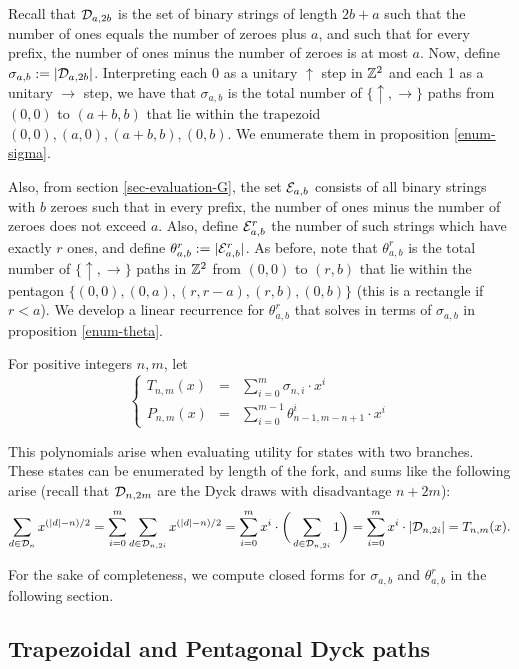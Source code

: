 Recall that $\mathcal{D}_{a,2b}$ is the set of binary strings of length $2b+a$ such that the number of ones equals the number of zeroes plus $a$, and such that for every prefix, the number of ones minus the number of zeroes is at most $a$. Now, define $\sigma_{a,b}:=|\mathcal{D}_{a,2b}|$. Interpreting each 0 as a unitary $\uparrow$ step in $\mathbb{Z}^2$ and each 1 as a unitary $\rightarrow$ step, we have that $\sigma_{a,b}$ is the total number of $\{\uparrow,\rightarrow\}$ paths from $(0,0)$ to $(a+b,b)$ that lie within the trapezoid ${(0,0),(a,0),(a+b,b),(0,b)}$. We enumerate them in proposition \ref{enum-sigma}.

Also, from section \ref{sec-evaluation-G}, the set $\mathcal{E}_{a,b}$ consists of all binary strings with $b$ zeroes such that in every prefix, the number of ones minus the number of zeroes does not exceed $a$. Also, define $\mathcal{E}_{a,b}^r$ the number of such strings which have exactly $r$ ones, and define $\theta_{a,b}^r:= |\mathcal{E}_{a,b}^r|$. As before, note that $\theta_{a,b}^r$ is the total number of $\{\uparrow,\rightarrow\}$ paths in $\mathbb{Z}^2$ from $(0,0)$ to $(r,b)$ that lie within the pentagon $\{(0,0),(0,a),(r,r-a), (r,b), (0,b)\}$ (this is a rectangle if $r<a$). We develop a linear recurrence for $\theta_{a,b}^r$ that solves in terms of $\sigma_{a,b}$ in proposition \ref{enum-theta}. 

\begin{mydef}
For positive integers $n,m$, let
$$
\left\{
\begin{array}{lll}
T_{n,m}(x) &=& \displaystyle \sum_{i = 0}^{m} \sigma_{n,i}\cdot x^i\\
P_{n,m}(x) &=& \displaystyle \sum_{i = 0}^{m-1} \theta_{n-1,m-n+1}^i\cdot x^i
\end{array}
\right.
$$
\end{mydef}

This polynomials arise when evaluating utility for states with two branches. These states can be enumerated by length of the fork, and sums like the following arise (recall that $\mathcal{D}_{n,2m}$ are the Dyck draws with disadvantage $n+2m$):
$$
\sum_{d\in \mathcal{D}_{n}} x^{(|d|-n)/2} = \sum_{i=0}^m \sum_{d\in \mathcal{D}_{n,2i}} x^{(|d|-n)/2} = \sum_{i=0}^m x^i\cdot  \bigg(\sum_{d\in\mathcal{D}_{n,2i}} 1\bigg) = \sum_{i=0}^m x^i\cdot |\mathcal{D}_{n,2i}| = T_{n,m}(x).
$$

For the sake of completeness, we compute closed forms for $\sigma_{a,b}$ and $\theta_{a,b}^r$ in the following section.



 \subsection{Trapezoidal and Pentagonal Dyck paths}
 \label{appendix-trapezoid}
 
